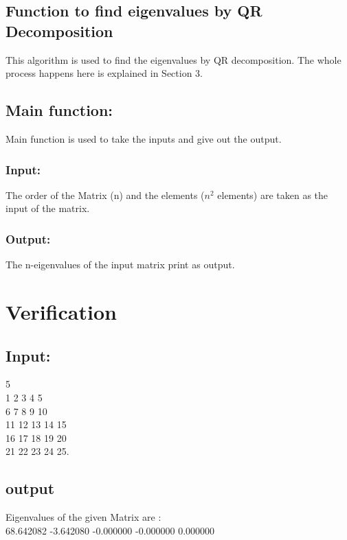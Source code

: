 \documentclass[12pt]{article}
\begin{document}
\subsection{Function to find eigenvalues by QR Decomposition}

This algorithm is used to find the eigenvalues by QR decomposition.
The whole process happens here is explained in Section 3.
\subsection{Main function: }

Main function is used to take the inputs and give out the output.
\subsubsection{Input: }
The order of the Matrix (n) and the elements ($n^2$ elements) are taken as the input of the matrix.
\subsubsection{Output: }
The n-eigenvalues of the input matrix print as output.
\section{Verification}
\subsection{Input: }
5\\
1 2 3 4 5\\
6 7 8 9 10\\
11 12 13 14 15\\
16 17 18 19 20\\
21 22 23 24 25.
\subsection{output}
Eigenvalues of the given Matrix are : \\
68.642082 -3.642080 -0.000000 -0.000000 0.000000 
\end{document}
